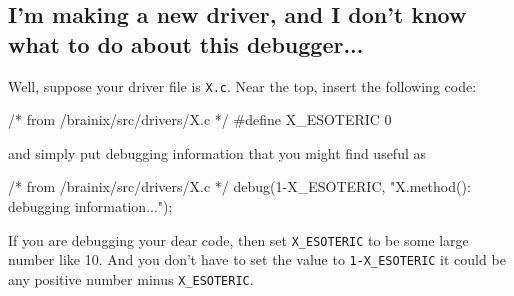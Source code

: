 \subsection{I'm making a new driver, and I don't know what to do about this debugger...}
Well, suppose your driver file is \verb|X.c|. Near the top, insert the following code:
\begin{code}
/* from /brainix/src/drivers/X.c */
 #define X_ESOTERIC     0
\end{code}
and simply put debugging information that you might find useful as
\begin{code}
/* from /brainix/src/drivers/X.c */
     debug(1-X_ESOTERIC, "X.method(): debugging information...");
\end{code}
If you are debugging your dear code, then set \verb|X_ESOTERIC| to be some large number like 10. And you don't have to set the value to \verb|1-X_ESOTERIC| it could be any positive number minus \verb|X_ESOTERIC|.
%
